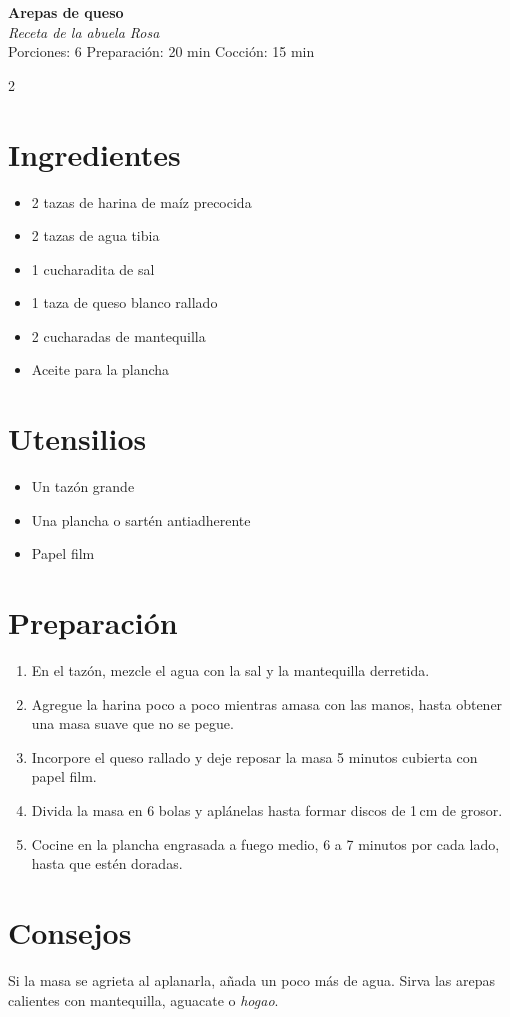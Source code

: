 \documentclass[11pt,a5paper]{article}
\begin{document}
\begin{center}
{\LARGE\bfseries Arepas de queso}\\[4pt]
\textit{Receta de la abuela Rosa}\\[2pt]
Porciones: 6 \quad Preparación: 20 min \quad Cocción: 15 min
\end{center}

\begin{multicols}{2}
\section*{Ingredientes}
\begin{itemize}
  \item 2 tazas de harina de maíz precocida
  \item 2 tazas de agua tibia
  \item 1 cucharadita de sal
  \item 1 taza de queso blanco rallado
  \item 2 cucharadas de mantequilla
  \item Aceite para la plancha
\end{itemize}

\columnbreak

\section*{Utensilios}
\begin{itemize}
  \item Un tazón grande
  \item Una plancha o sartén antiadherente
  \item Papel film
\end{itemize}
\end{multicols}

\section*{Preparación}
\begin{enumerate}
  \item En el tazón, mezcle el agua con la sal y la mantequilla derretida.
  \item Agregue la harina poco a poco mientras amasa con las manos, hasta obtener una
        masa suave que no se pegue.
  \item Incorpore el queso rallado y deje reposar la masa 5 minutos cubierta con papel
        film.
  \item Divida la masa en 6 bolas y aplánelas hasta formar discos de 1\,cm de grosor.
  \item Cocine en la plancha engrasada a fuego medio, 6 a 7 minutos por cada lado, hasta
        que estén doradas.
\end{enumerate}

\section*{Consejos}
Si la masa se agrieta al aplanarla, añada un poco más de agua. Sirva las arepas calientes
con mantequilla, aguacate o \emph{hogao}.
\end{document}
